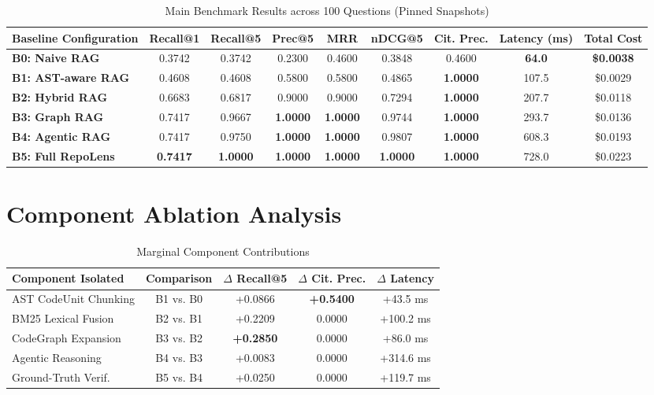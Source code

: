 \documentclass[sigconf,screen]{acmart}
\begin{document}
\begin{table}[t]
\caption{Main Benchmark Results across 100 Questions (Pinned Snapshots)}
\label{tab:main_results}
\begin{tabular}{lcccccccc}
\toprule
Baseline Configuration & Recall@1 & Recall@5 & Prec@5 & MRR & nDCG@5 & Cit. Prec. & Latency (ms) & Total Cost \\
\midrule
\textbf{B0: Naive RAG} & 0.3742 & 0.3742 & 0.2300 & 0.4600 & 0.3848 & 0.4600 & \textbf{64.0} & \textbf{\$0.0038} \\
\textbf{B1: AST-aware RAG} & 0.4608 & 0.4608 & 0.5800 & 0.5800 & 0.4865 & \textbf{1.0000} & 107.5 & \$0.0029 \\
\textbf{B2: Hybrid RAG} & 0.6683 & 0.6817 & 0.9000 & 0.9000 & 0.7294 & \textbf{1.0000} & 207.7 & \$0.0118 \\
\textbf{B3: Graph RAG} & 0.7417 & 0.9667 & \textbf{1.0000} & \textbf{1.0000} & 0.9744 & \textbf{1.0000} & 293.7 & \$0.0136 \\
\textbf{B4: Agentic RAG} & 0.7417 & 0.9750 & \textbf{1.0000} & \textbf{1.0000} & 0.9807 & \textbf{1.0000} & 608.3 & \$0.0193 \\
\textbf{B5: Full RepoLens} & \textbf{0.7417} & \textbf{1.0000} & \textbf{1.0000} & \textbf{1.0000} & \textbf{1.0000} & \textbf{1.0000} & 728.0 & \$0.0223 \\
\bottomrule
\end{tabular}
\end{table}

\section{Component Ablation Analysis}
\begin{table}[h]
\caption{Marginal Component Contributions}
\label{tab:ablation}
\begin{tabular}{lcccc}
\toprule
Component Isolated & Comparison & $\Delta$ Recall@5 & $\Delta$ Cit. Prec. & $\Delta$ Latency \\
\midrule
AST CodeUnit Chunking & B1 vs. B0 & +0.0866 & \textbf{+0.5400} & +43.5 ms \\
BM25 Lexical Fusion & B2 vs. B1 & +0.2209 & 0.0000 & +100.2 ms \\
CodeGraph Expansion & B3 vs. B2 & \textbf{+0.2850} & 0.0000 & +86.0 ms \\
Agentic Reasoning & B4 vs. B3 & +0.0083 & 0.0000 & +314.6 ms \\
Ground-Truth Verif. & B5 vs. B4 & +0.0250 & 0.0000 & +119.7 ms \\
\bottomrule
\end{tabular}
\end{table}
\end{document}

